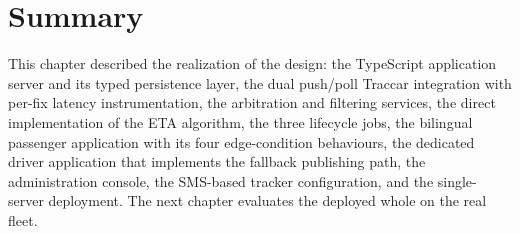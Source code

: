 \section{Summary}
This chapter described the realization of the design: the TypeScript
application server and its typed persistence layer, the dual push/poll
Traccar integration with per-fix latency instrumentation, the
arbitration and filtering services, the direct implementation of the ETA
algorithm, the three lifecycle jobs, the bilingual passenger application
with its four edge-condition behaviours, the dedicated driver
application that implements the fallback publishing path, the
administration console, the SMS-based tracker configuration, and the
single-server deployment. The next chapter evaluates the deployed whole
on the real fleet.
